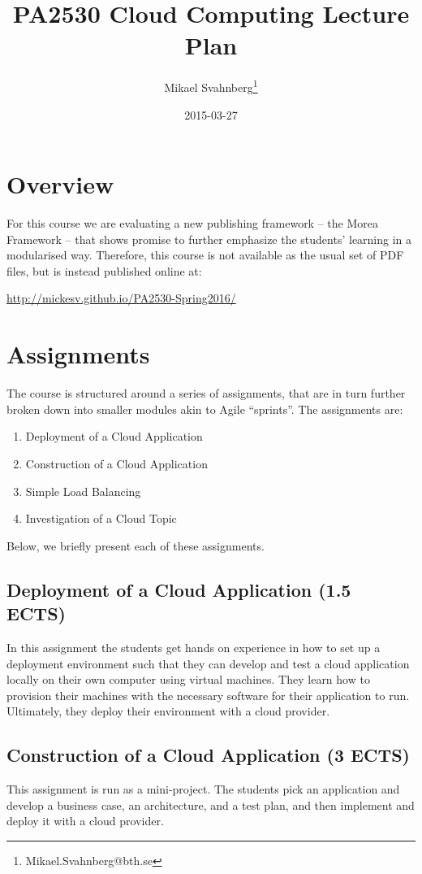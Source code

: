 \documentclass[11pt]{article}
\author{Mikael Svahnberg\thanks{Mikael.Svahnberg@bth.se}}
\date{2015-03-27}
\title{PA2530 Cloud Computing Lecture Plan}
\begin{document}
\maketitle
\tableofcontents



\section{Overview}
\label{sec-1}
For this course we are evaluating a new publishing framework -- the Morea Framework -- that shows promise to further emphasize the students' learning in a modularised way. Therefore, this course is not available as the usual set of PDF files, but is instead published online at:

\url{http://mickesv.github.io/PA2530-Spring2016/}

\section{Assignments}
\label{sec-2}
The course is structured around a series of assignments, that are in turn further broken down into smaller modules akin to Agile ``sprints''. The assignments are:

\begin{enumerate}
\item Deployment of a Cloud Application
\item Construction of a Cloud Application
\item Simple Load Balancing
\item Investigation of a Cloud Topic
\end{enumerate}

Below, we briefly present each of these assignments.

\subsection{Deployment of a Cloud Application (1.5 ECTS)}
\label{sec-2-1}
In this assignment the students get hands on experience in how to set up a deployment environment such that they can develop and test a cloud application locally on their own computer using virtual machines. They learn how to provision their machines with the necessary software for their application to run. Ultimately, they deploy their environment with a cloud provider.
\subsection{Construction of a Cloud Application (3 ECTS)}
\label{sec-2-2}
This assignment is run as a mini-project. The students pick an application and develop a business case, an architecture, and a test plan, and then implement and deploy it with a cloud provider.
\end{document}

